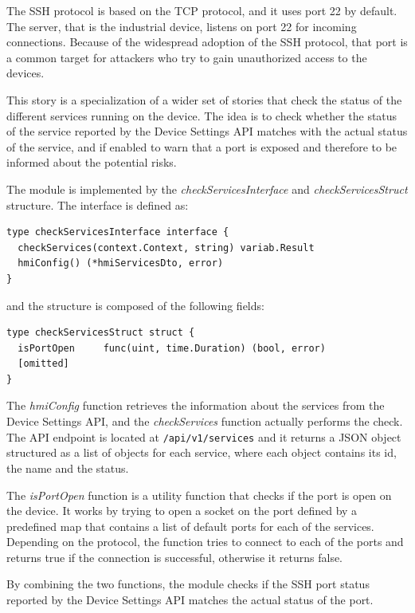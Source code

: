 The SSH protocol is based on the TCP protocol, and it uses port 22 by default. The server, that is the industrial device, listens on port 22 for incoming connections. Because of the widespread adoption of the SSH protocol, that port is a common target for attackers who try to gain unauthorized access to the devices.

This story is a specialization of a wider set of stories that check the status of the different services running on the device. The idea is to check whether the status of the service reported by the Device Settings API matches with the actual status of the service, and if enabled to warn that a port is exposed and therefore to be informed about the potential risks.

The module is implemented by the \textit{checkServicesInterface} and \textit{checkServicesStruct} structure. The interface is defined as:

\begin{lstlisting}[style=golang]
type checkServicesInterface interface {
  checkServices(context.Context, string) variab.Result
  hmiConfig() (*hmiServicesDto, error)
}
\end{lstlisting}

and the structure is composed of the following fields:

\begin{lstlisting}[style=golang]
type checkServicesStruct struct {
  isPortOpen     func(uint, time.Duration) (bool, error)
  [omitted]
}
\end{lstlisting}

The \textit{hmiConfig} function retrieves the information about the services from the Device Settings API, and the \textit{checkServices} function actually performs the check. The API endpoint is located at \texttt{/api/v1/services} and it returns a JSON object structured as a list of objects for each service, where each object contains its id, the name and the status.

The \textit{isPortOpen} function is a utility function that checks if the port is open on the device. It works by trying to open a socket on the port defined by a predefined map that contains a list of default ports for each of the services. Depending on the protocol, the function tries to connect to each of the ports and returns true if the connection is successful, otherwise it returns false.

By combining the two functions, the module checks if the SSH port status reported by the Device Settings API matches the actual status of the port.

